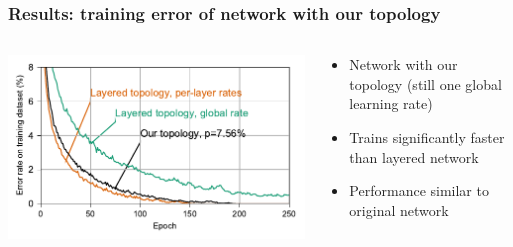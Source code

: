 \documentclass[pdf]{beamer}
\begin{document}
\begin{frame}
	\frametitle{Results: training error of network with our topology}
	\begin{columns}
	\begin{column}{.6\textwidth}
		\includegraphics[width=\textwidth]{figures/performance_original+global+ours.pdf}
	\end{column}
	\begin{column}{.4\textwidth}
	\begin{itemize}
		\item Network with our topology (still one global learning rate)
		\item Trains significantly faster than layered network
		\item Performance similar to original network
	\end{itemize}
	\end{column}
	\end{columns}
\end{frame}
\end{document}
